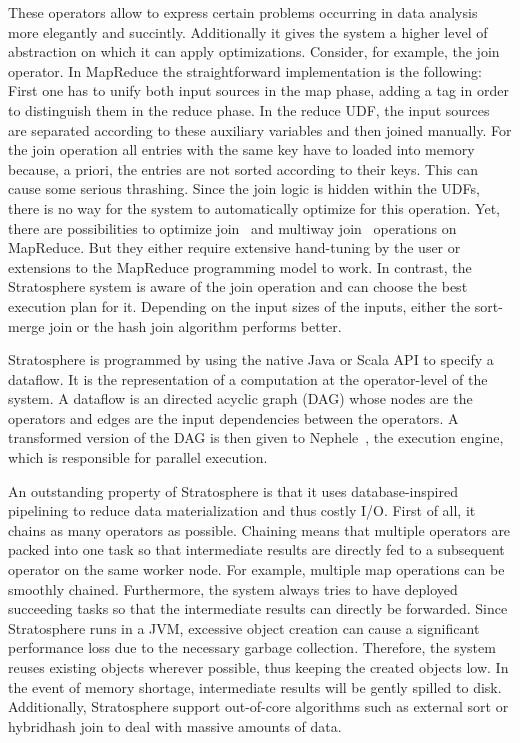 These operators allow to express certain problems occurring in data analysis more elegantly and succintly.
Additionally it gives the system a higher level of abstraction on which it can apply optimizations.
Consider, for example, the join operator.
In MapReduce the straightforward implementation is the following:
First one has to unify both input sources in the map phase, adding a tag in order to distinguish them in the reduce phase.
In the reduce UDF, the input sources are separated according to these auxiliary variables and then joined manually.
For the join operation all entries with the same key have to loaded into memory because, a priori, the entries are not sorted according to their keys.
This can cause some serious thrashing.
Since the join logic is hidden within the UDFs, there is no way for the system to automatically optimize for this operation.
Yet, there are possibilities to optimize join~\cite{blanas:2010a} and multiway join~\cite{afrati:2010a} operations on MapReduce.
But they either require extensive hand-tuning by the user or extensions to the MapReduce programming model to work.
In contrast, the Stratosphere system is aware of the join operation and can choose the best execution plan for it.
Depending on the input sizes of the inputs, either the sort-merge join or the hash join algorithm performs better.

Stratosphere is programmed by using the native Java or Scala API to specify a dataflow.
It is the representation of a computation at the operator-level of the system.
A dataflow is an directed acyclic graph (DAG) whose nodes are the operators and edges are the input dependencies between the operators.
A transformed version of the DAG is then given to Nephele~\cite{warneke:2009a}, the execution engine, which is responsible for parallel execution.

An outstanding property of Stratosphere is that it uses database-inspired pipelining to reduce data materialization and thus costly I/O.
First of all, it chains as many operators as possible.
Chaining means that multiple operators are packed into one task so that intermediate results are directly fed to a subsequent operator on the same worker node.
For example, multiple map operations can be smoothly chained.
Furthermore, the system always tries to have deployed succeeding tasks so that the intermediate results can directly be forwarded.
Since Stratosphere runs in a JVM, excessive object creation can cause a significant performance loss due to the necessary garbage collection.
Therefore, the system reuses existing objects wherever possible, thus keeping the created objects low.
In the event of memory shortage, intermediate results will be gently spilled to disk.
Additionally, Stratosphere support out-of-core algorithms such as external sort or hybridhash join to deal with massive amounts of data.


